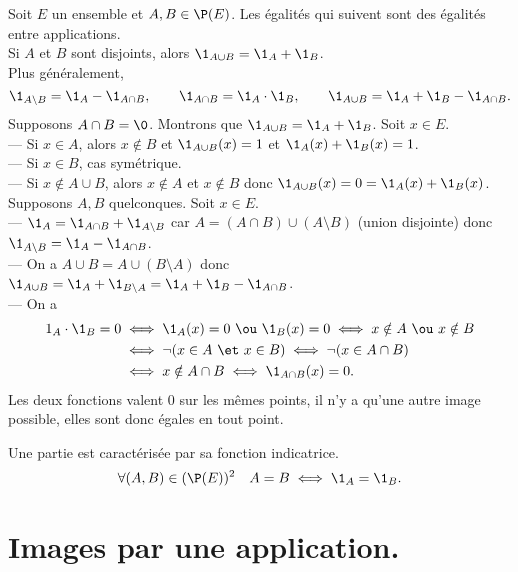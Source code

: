 \documentclass[11pt]{article}
\begin{document}
\begin{prop}{}{}
    Soit $E$ un ensemble et $A,B\in\P(E)$. Les égalités qui suivent sont des égalités entre applications.\\
    Si $A$ et $B$ sont disjoints, alors $\1_{A\cup B}=\1_A + \1_B$.\\
    Plus généralement,
    \begin{equation*}
        \1_{A\setminus B}=\1_A - \1_{A\cap B}, \qquad \1_{A\cap B}=\1_A\cdot\1_B, \qquad \1_{A\cup B}=\1_A+\1_B-\1_{A\cap B}.
    \end{equation*}
    \tcblower
     Supposons $A\cap B=\0$. Montrons que $\1_{A\cup B}=\1_A+\1_B$. Soit $x\in E$.\\
    --- Si $x\in A$, alors $x\notin B$ et $\1_{A\cup B}(x)=1$ et $\1_A(x)+\1_B(x)=1$.\\
    --- Si $x\in B$, cas symétrique.\\
    --- Si $x\notin A\cup B$, alors $x\notin A$ et $x\notin B$ donc $\1_{A\cup B}(x) = 0 = \1_A(x) + \1_B(x)$.\\
     Supposons $A,B$ quelconques. Soit $x\in E$.\\
    --- $\1_A = \1_{A\cap B} + \1_{A \setminus B}$ car $A=(A\cap B)\cup(A\setminus B)$ (union disjointe) donc $\1_{A\setminus B}=\1_A-\1_{A\cap B}$.\\
    --- On a $A\cup B= A\cup (B\setminus A)$ donc $\1_{A\cup B}=\1_A + \1_{B\setminus A} = \1_A + \1_B - \1_{A\cap B}$.\\
    --- On a \begin{align*}
        1_A\cdot\1_B=0 &\iff \1_A(x) = 0~\ou~\1_B(x)=0 \iff x\notin A~\ou~x\notin B\\
        &\iff \lnot (x \in A ~\et~ x\in B) \iff \lnot(x\in A\cap B)\\
        &\iff x\notin A\cap B \iff \1_{A\cap B}(x)=0.
    \end{align*}
    Les deux fonctions valent $0$ sur les mêmes points, il n'y a qu'une autre image possible, elles sont donc égales en tout point.
\end{prop}

\begin{prop}{Une partie est caractérisée par sa fonction indicatrice.}{}
    \begin{equation*}
        \forall (A,B) \in (\P(E))^2 \quad A = B \iff \1_A = \1_B.
    \end{equation*}
\end{prop}


\section{Images par une application.}
\end{document}
